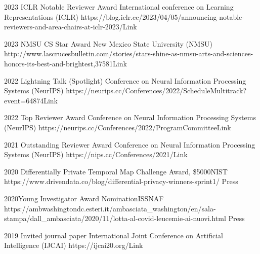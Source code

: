 \begin{awards}
	\awardentry
	{2023}
	{ICLR Notable Reviewer Award}%
	{International conference on Learning Representations (ICLR)} 
	{https://blog.iclr.cc/2023/04/05/announcing-notable-reviewers-and-area-chairs-at-iclr-2023/}{Link}

	\awardentry
	{2023}
	{NMSU CS Star Award}%
	{New Mexico State University (NMSU)} 
	{http://www.lascrucesbulletin.com/stories/stars-shine-as-nmsu-arts-and-sciences-honors-its-best-and-brightest,37581}{Link}


	\awardentry
	{2022}
	{Lightning Talk (Spotlight)}%
	{Conference on Neural Information Processing Systems (NeurIPS)} 
	{https://neurips.cc/Conferences/2022/ScheduleMultitrack?event=64874}{Link}

	\awardentry
	{2022}
	{Top Reviewer Award}%
	{Conference on Neural Information Processing Systems (NeurIPS)} 
	{https://neurips.cc/Conferences/2022/ProgramCommittee}{Link}

	\awardentry
	{2021}
	{Outstanding Reviewer Award}%
	{Conference on Neural Information Processing Systems (NeurIPS)} 
	{https://nips.cc/Conferences/2021/}{Link}

	\awardentry
	{2020}
	{Differentially Private Temporal Map Challenge Award, \$5000}{NIST}
	{https://www.drivendata.co/blog/differential-privacy-winners-sprint1/}
	{Press}

\awardentry
  	{2020}{Young Investigator Award Nomination}{ISSNAF} 
	{https://ambwashingtondc.esteri.it/ambasciata\_washington/en/sala-stampa/dall\_ambasciata/2020/11/lotta-al-covid-leucemie-ai-nuovi.html}
	{Press}

	\awardentry
	{2019}
	{Invited journal paper}%
	{International Joint Conference on Artificial Intelligence (IJCAI)}
	{https://ijcai20.org/}{Link}


\end{awards}
